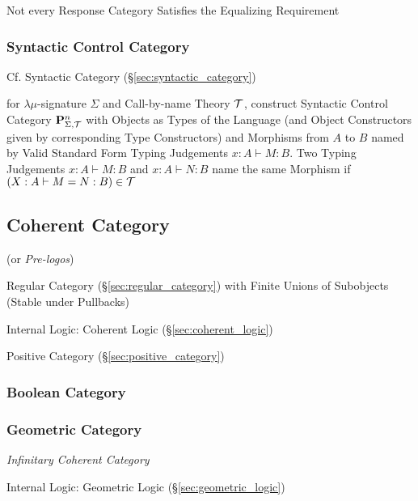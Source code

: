 \fist Not every Response Category Satisfies the Equalizing Requirement



\subsubsection{Syntactic Control Category}
\label{sec:syntactic_control_category}

\fist Cf. Syntactic Category (\S\ref{sec:syntactic_category})

for $\lambda\mu$-signature $\Sigma$ and Call-by-name Theory
$\mathcal{T}$, construct Syntactic Control Category
$\mathbf{P}^n_{\Sigma,\mathcal{T}}$ with Objects as Types of the Language
(and Object Constructors given by corresponding Type Constructors) and
Morphisms from $A$ to $B$ named by Valid Standard Form Typing
Judgements $x:A \vdash M:B$. Two Typing Judgements $x:A \vdash M:B$
and $x:A \vdash N:B$ name the same Morphism if $(X:A \vdash M=N:B) \in
\mathcal{T}$




\subsection{Coherent Category}\label{sec:coherent_category}

(or \emph{Pre-logos})

Regular Category (\S\ref{sec:regular_category}) with Finite Unions of
Subobjects (Stable under Pullbacks)

Internal Logic: Coherent Logic (\S\ref{sec:coherent_logic})

Positive Category (\S\ref{sec:positive_category})



\subsubsection{Boolean Category}\label{sec:boolean_category}

\subsubsection{Geometric Category}\label{sec:geometric_category}

\emph{Infinitary Coherent Category}

Internal Logic: Geometric Logic (\S\ref{sec:geometric_logic})

